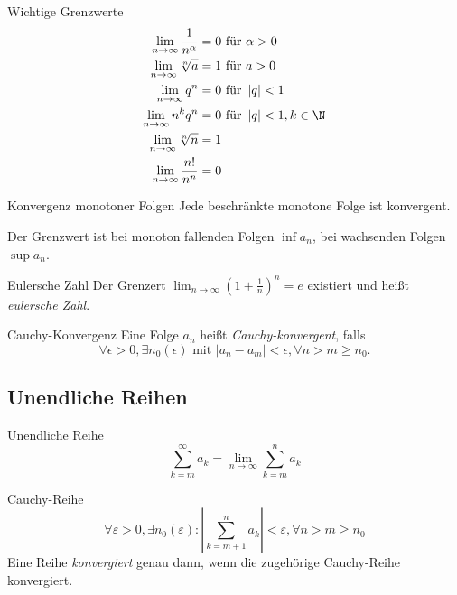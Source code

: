 \documentclass[german]{../spicker}
\renewcommand{\abs}[1]{\left| #1 \right|}
\begin{document}
\begin{bonus}{Wichtige Grenzwerte}
    $$
        \begin{aligned}
            \lim_{n\to\infty} \frac{1}{n^\alpha} & = 0 \text{ für } \alpha >0             \\
            \lim_{n\to\infty} \sqrt[n]{a}        & = 1 \text{ für } a > 0                 \\
            \lim_{n\to\infty} q^n                & = 0 \text{ für } \abs{q} < 1           \\
            \lim_{n\to\infty} n^kq^n             & = 0 \text{ für } \abs{q} < 1, k \in \N \\
            \lim_{n\to\infty} \sqrt[n]{n}        & = 1                                    \\
            \lim_{n\to\infty} \frac{n!}{n^n}     & = 0
        \end{aligned}
    $$
\end{bonus}

\begin{defi}{Konvergenz monotoner Folgen}
    Jede beschränkte monotone Folge ist konvergent.

    Der Grenzwert ist bei monoton fallenden Folgen $\inf a_n$, bei wachsenden Folgen $\sup a_n$.
\end{defi}

\begin{defi}{Eulersche Zahl}
    Der Grenzert $\lim_{n\to\infty} \left(1 + \frac{1}{n}\right)^n = e$ existiert und heißt \emph{eulersche Zahl}.
\end{defi}

\begin{defi}{Cauchy-Konvergenz}
    Eine Folge $a_n$ heißt \emph{Cauchy-konvergent}, falls
    $$
        \forall\epsilon > 0, \exists n_0 (\epsilon) \text{ mit } \abs{a_n-a_m} < \epsilon, \forall n > m \geq n_0.
    $$
\end{defi}

\subsection{Unendliche Reihen}
\begin{defi}{Unendliche Reihe}
    \[
        \sum_{k=m}^{\infty} a_k = \lim_{n\to\infty} \sum_{k=m}^{n} a_k
    \]
\end{defi}

\begin{defi}{Cauchy-Reihe}
    \[
        \forall\varepsilon>0 , \exists n_0(\varepsilon) : \left| \sum_{k=m+1}^n a_k \right| < \varepsilon , \forall n>m\geq n_0
    \]
    Eine Reihe \emph{konvergiert} genau dann, wenn die zugehörige Cauchy-Reihe konvergiert.
\end{defi}
\end{document}
